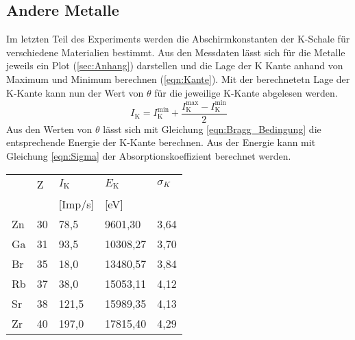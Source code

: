 \subsection{Andere Metalle}
Im letzten Teil des Experiments werden die Abschirmkonstanten der K-Schale für verschiedene Materialien bestimmt.
Aus den Messdaten lässt sich für die Metalle jeweils ein Plot (\ref{sec:Anhang}) darstellen und die Lage der K Kante anhand von Maximum und Minimum berechnen (\ref{eqn:Kante}).
Mit der berechnetetn Lage der K-Kante kann nun der Wert von $\theta$ für die jeweilige K-Kante abgelesen werden. 
\begin{equation}
    I_{\text{K}}= I_{\text{K}}^{\text{min}} + \frac{I_{\text{K}}^{\text{max}}-I_{\text{K}}^{\text{min}}}{2} \label{eqn:Kante}
\end{equation}
Aus den Werten von $\theta$ lässt sich mit Gleichung \ref{eqn:Bragg_Bedingung} die entsprechende Energie der K-Kante berechnen.
Aus der Energie kann mit Gleichung \ref{eqn:Sigma} der Absorptionskoeffizient berechnet werden.
\begin{table}[H]
\centering
\begin{tabular}{lllll}
  & Z & $I_{\text{K}}$ & $E_{\text{K}}$ & $\sigma_K$\\
  &   & [Imp/s]& [eV] &   \\
  \toprule
Zn & 30 & 78,5 & 9601,30 & 3,64 \\
\midrule
Ga & 31 & 93,5 & 10308,27 & 3,70 \\ 
\midrule
Br & 35 & 18,0 & 13480,57 & 3,84\\ 
\midrule
Rb & 37 & 38,0 & 15053,11 & 4,12 \\ 
\midrule
Sr & 38 & 121,5 & 15989,35 & 4,13 \\
\midrule
Zr & 40 & 197,0 & 17815,40 & 4,29 \\
\bottomrule
\end{tabular}
\end{table}

